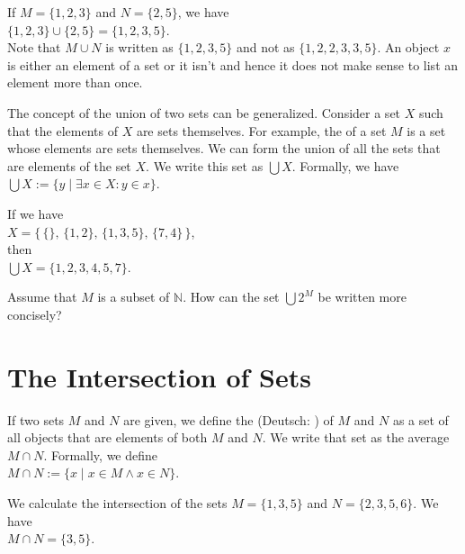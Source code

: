 \exampleEng
If $M = \{1,2,3\}$ and $N = \{2,5\}$, we have 
\\[0.2cm]
\hspace*{1.3cm} 
$\{1,2,3\} \cup \{2,5\} = \{1,2,3,5\}$.  
\\[0.2cm]
Note that $M \cup N$ is written as $\{1,2,3,5\}$  and not as $\{1,2,2,3,3,5\}$.
An object $x$ is either an element of a set or it isn't and hence it does not make sense to list an element
more than once.
\eox
\vspace*{0.2cm}

The concept of the union of two sets can be generalized.  Consider
a set $X$ such that the elements of $X$ are sets themselves. For example, the
 of a set $M$ is a set whose elements are sets themselves.  We can form the union of all the 
sets that are elements of the set $X$.  We write this set as $\bigcup X$.  Formally,
we have
\\[0.2cm]
\hspace*{1.3cm} $\bigcup X := \{ y \;|\; \exists x \in X: y \in x \}$.

\exampleEng
If we have \\[0.2cm]
\hspace*{1.3cm}
 $X = \big\{\, \{\},\, \{1,2\}, \, \{1,3,5\}, \, \{7,4\}\,\big\}$, \\[0.2cm]
then \\[0.2cm] 
\hspace*{1.3cm}
 $\bigcup X = \{ 1, 2, 3, 4, 5, 7 \}$. \eox
\vspace*{0.2cm}

\exerciseEng
Assume that $M$ is a subset of $\mathbb{N}$.  How can the set $\bigcup 2^M$ be written more concisely?
\eox

\section{The Intersection of Sets}
If two sets $M$ and $N$ are given, we define the  (Deutsch: ) 
 
of $M$ and $N$ as a set of all objects that are
elements of both $M$ and  $N$.  We write that set as the average $M \cap N$.
Formally, we define 
\\[0.2cm]
\hspace*{1.3cm} $M \cap N := \{ x \mid x \in M \wedge x \in N \}$.

\exampleEng
We calculate the intersection of the sets $M = \{ 1, 3, 5 \}$ and $N = \{ 2, 3, 5, 6 \}$.  We have
\\[0.2cm]
\hspace*{1.3cm} $M \cap N = \{ 3, 5 \}$.
\eox
\vspace*{0.2cm}

